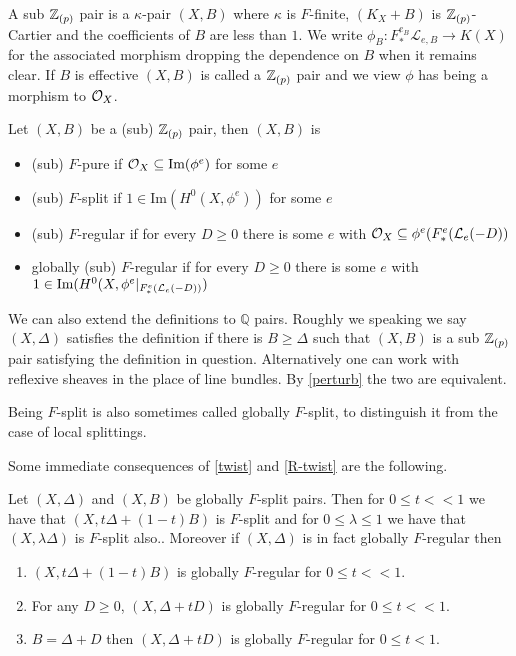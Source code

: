 \begin{definition}
	A sub $\mathbb{Z}_{(p)}$ pair is a $\kappa$-pair $(X,B)$ where $\kappa$ is $F$-finite, $(K_{X}+B)$ is $\mathbb{Z}_{(p)}$-Cartier and the coefficients of $B$ are less than $1$. We write $\phi_{B}: F_{*}^{e_{B}}\mathcal{L}_{e,B} \to K(X)$ for the associated morphism dropping the dependence on $B$ when it remains clear. If $B$ is effective $(X,B)$ is called a $\mathbb{Z}_{(p)}$ pair and we view $\phi$ has being a morphism to $\mathcal{O}_{X}$.
	
	Let $(X,B)$ be a (sub) $\mathbb{Z}_{(p)}$ pair, then $(X,B)$ is
	\begin{itemize}
		\item (sub) $F$-pure if $\mathcal{O}_{X} \subseteq \text{Im}(\phi^{e})$ for some $e$
		\item (sub) $F$-split if $1\in\text{Im}(H^{0}(X,\phi^{e}))$ for some $e$
		\item (sub) $F$-regular if for every $D \geq 0$ there is some $e$ with $\mathcal{O}_{X} \subseteq \phi^{e}(F^{e}_{*}(\mathcal{L}_{e}(-D))$ 
		\item globally (sub) $F$-regular if for every $D \geq 0$ there is some $e$ with $1\in\text{Im}(H^{0}(X,\phi^{e}|_{F^{e}_{*}(\mathcal{L}_{e}(-D))})$ 
	\end{itemize}
\end{definition}

\begin{remark}\label{R-Def}
	
	We can also extend the definitions to $\mathbb{Q}$ pairs. Roughly we speaking we say $(X,\Delta)$ satisfies the definition if there is $B \geq \Delta$ such that $(X,B)$ is a sub $\mathbb{Z}_{(p)}$ pair satisfying the definition in question. Alternatively one can work with reflexive sheaves in the place of line bundles. By \autoref{perturb} the two are equivalent.	
	\end{remark}

Being $F$-split is also sometimes called globally $F$-split, to distinguish it from the case of local splittings.

Some immediate consequences of \autoref{twist} and \autoref{R-twist} are the following.

\begin{lemma}\label{perturb}
	
	Let $(X,\Delta)$ and $(X,B)$ be globally $F$-split pairs. Then for $0 \leq t <<1$ we have that $(X,t\Delta+(1-t)B)$ is $F$-split and for $0 \leq \lambda \leq 1$ we have that $(X,\lambda \Delta)$ is $F$-split also.. Moreover if $(X,\Delta)$ is in fact globally $F$-regular then
	
	\begin{enumerate}
		\item $(X,t\Delta +(1-t)B)$ is globally $F$-regular for $0 \leq t <<1$.
		\item For any $D \geq 0$, $(X,\Delta+tD)$ is globally $F$-regular for $0 \leq t <<1$. 
		\item $B=\Delta+D$ then $(X,\Delta+tD)$ is globally $F$-regular for $0 \leq t <1$.
	\end{enumerate}

	\end{lemma}

